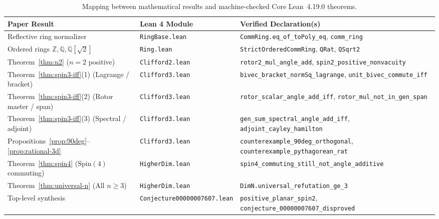 \documentclass[11pt]{article}
\theoremstyle{definition}
\newcommand{\Spin}{\mathrm{Spin}}
\begin{document}
\begin{table}[ht]
\centering
\footnotesize
\setlength{\tabcolsep}{5pt}
\renewcommand{\arraystretch}{1.22}
\begin{tabular}{|>{\raggedright\arraybackslash}p{1.62in}|l|>{\raggedright\arraybackslash}p{2.58in}|}
\hline
\textbf{Paper Result} & \textbf{Lean 4 Module} & \textbf{Verified Declaration(s)} \\
\hline
Reflective ring normalizer & \texttt{RingBase.lean} &
\texttt{CommRing.eq\_of\_toPoly\_eq}, \newline \texttt{comm\_ring} \\
\hline
Ordered rings $\mathbb{Z}, \mathbb{Q}, \mathbb{Q}[\sqrt{2}]$ & \texttt{Ring.lean} &
\texttt{StrictOrderedCommRing}, \texttt{QRat}, \texttt{QSqrt2} \\
\hline
Theorem~\ref{thm:n2} ($n = 2$ positive) & \texttt{Clifford2.lean} &
\texttt{rotor2\_mul\_angle\_add}, \newline \texttt{spin2\_positive\_nonvacuity} \\
\hline
Theorem~\ref{thm:spin3-iff}(1) (Lagrange / bracket) & \texttt{Clifford3.lean} &
\texttt{bivec\_bracket\_normSq\_lagrange}, \newline \texttt{unit\_bivec\_commute\_iff} \\
\hline
Theorem~\ref{thm:spin3-iff}(2) (Rotor master / span) & \texttt{Clifford3.lean} &
\texttt{rotor\_scalar\_angle\_add\_iff}, \newline \texttt{rotor\_mul\_not\_in\_gen\_span} \\
\hline
Theorem~\ref{thm:spin3-iff}(3) (Spectral / adjoint) & \texttt{Clifford3.lean} &
\texttt{gen\_sum\_spectral\_angle\_add\_iff}, \newline \texttt{adjoint\_cayley\_hamilton} \\
\hline
Propositions~\ref{prop:90deg}--\ref{prop:rational-3d} & \texttt{Clifford3.lean} &
\texttt{counterexample\_90deg\_orthogonal}, \newline \texttt{counterexample\_pythagorean\_rat} \\
\hline
Theorem~\ref{thm:spin4} ($\Spin(4)$ commuting) & \texttt{HigherDim.lean} &
\texttt{spin4\_commuting\_still\_not\_angle\_additive} \\
\hline
Theorem~\ref{thm:universal-n} (All $n \ge 3$) & \texttt{HigherDim.lean} &
\texttt{DimN.universal\_refutation\_ge\_3} \\
\hline
Top-level synthesis & \texttt{Conjecture00000007607.lean} &
\texttt{positive\_planar\_spin2}, \newline \texttt{conjecture\_00000007607\_disproved} \\
\hline
\end{tabular}
\caption{Mapping between mathematical results and machine-checked Core Lean~4.19.0 theorems.}
\label{tab:lean-map}
\end{table}
\end{document}

